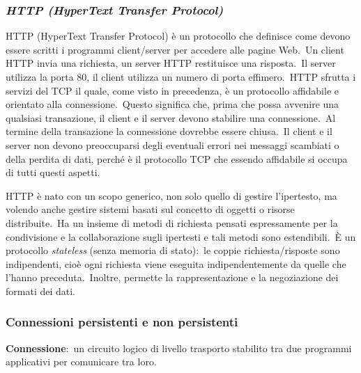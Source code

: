 \subsubsection{\emph{HTTP (HyperText Transfer Protocol)}}

HTTP (HyperText Transfer Protocol) è un protocollo che definisce come devono essere scritti i programmi client/server per accedere alle pagine Web.\
Un client HTTP invia una richiesta, un server HTTP restituisce una risposta.\
Il server utilizza la porta 80, il client utilizza un numero di porta effimero.\
HTTP sfrutta i servizi del TCP il quale, come visto in precedenza, è un protocollo affidabile e orientato alla connessione.\
Questo significa che, prima che possa avvenire una qualsiasi transazione, il client e il server devono stabilire una connessione.\
Al termine della transazione la connessione dovrebbe essere chiusa.\
Il client e il server non devono preoccuparsi degli eventuali errori nei messaggi scambiati o della perdita di dati, perché è il protocollo TCP che essendo affidabile si occupa di tutti questi aspetti.

HTTP è nato con un scopo generico, non solo quello di gestire l'ipertesto, ma volendo anche gestire sistemi basati sul concetto di oggetti o risorse distribuite.\
Ha un insieme di metodi di richiesta pensati espressamente per la condivisione e la collaborazione sugli ipertesti e tali metodi sono estendibili.\
È un protocollo \emph{stateless} (senza memoria di stato):\ le coppie richiesta/risposte sono indipendenti, cioè ogni richiesta viene eseguita indipendentemente da quelle che l'hanno preceduta.\
Inoltre, permette la rappresentazione e la negoziazione dei formati dei dati.

\subsubsection{Connessioni persistenti e non persistenti}

\textbf{Connessione}:\ un circuito logico di livello trasporto stabilito tra due programmi applicativi per comunicare tra loro.

